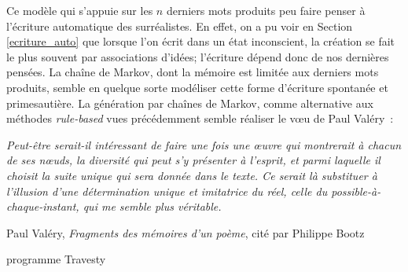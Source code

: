 \documentclass{article}
\newenvironment{citationbox}
{\begin{center}
		\begin{minipage}{.8\textwidth}
		}
		{
		\end{minipage}	
\end{center}
}
\begin{document}
				Ce modèle qui s'appuie sur les $n$ derniers mots produits peu faire penser à l'écriture automatique des surréalistes. En effet, on a pu voir en Section \ref{ecriture_auto} que lorsque l'on écrit dans un état inconscient, la création se fait le plus souvent par associations d'idées; l'écriture dépend donc de nos dernières pensées. La chaîne de Markov, dont la mémoire est limitée aux derniers mots produits, semble en quelque sorte modéliser cette forme d'écriture spontanée et primesautière. La génération par chaînes de Markov, comme alternative aux méthodes \textit{rule-based} vues précédemment semble réaliser le vœu de Paul Valéry~:
				\begin{citationbox}
					\textit{Peut-être serait-il intéressant de faire une fois une œuvre qui montrerait à chacun de ses nœuds, la diversité qui peut s’y présenter à l’esprit, et parmi laquelle il choisit la suite unique qui sera donnée dans le texte. Ce serait là substituer à l’illusion d’une détermination unique et imitatrice du réel, celle du possible-à-chaque-instant, qui me semble plus véritable.} 
					\begin{flushleft}
						Paul Valéry, \textit{Fragments des mémoires d'un poème}, cité par Philippe Bootz \cite{bootz2012}
					\end{flushleft}
				\end{citationbox}
				
				
				
				
			
			programme Travesty
\end{document}
